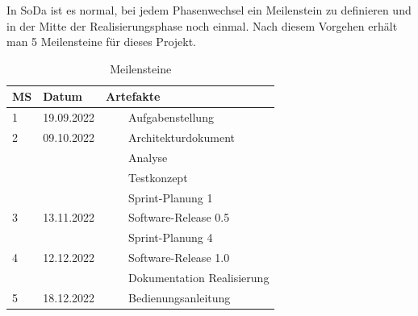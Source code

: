 \documentclass[a4paper, table]{article}
\newcommand{\tabitem}{~~\llap{\textbullet}~~}
\begin{document}
In \gls{SoDa} ist es normal, bei jedem Phasenwechsel ein Meilenstein zu definieren und in der Mitte der
Realisierungsphase noch einmal. \autocite{jenny_projektmanagement_2016} %
Nach diesem Vorgehen erhält man 5 Meilensteine für dieses Projekt.

\begin{table}[h]
    \centering
    \begin{tabular}{|l|l|l|}
        \hline
        \rowcolor[gray]{.9} MS & Datum & Artefakte \\
        \hline
        1 & 19.09.2022 & \tabitem Aufgabenstellung \\
        \hline
        2 & 09.10.2022 & \tabitem Architekturdokument \\
         & & \tabitem Analyse \\
         & & \tabitem Testkonzept \\
         & & \tabitem Sprint-Planung 1 \\
        \hline
        3 & 13.11.2022 & \tabitem Software-Release 0.5 \\
         & & \tabitem Sprint-Planung 4 \\
        \hline
        4 & 12.12.2022 & \tabitem Software-Release 1.0 \\
         & & \tabitem Dokumentation Realisierung \\
        \hline
        5 & 18.12.2022 & \tabitem Bedienungsanleitung \\
        \hline
    \end{tabular}
    \caption{Meilensteine}
    \label{tab: Meilensteine}
\end{table}
\clearpage
\end{document}

